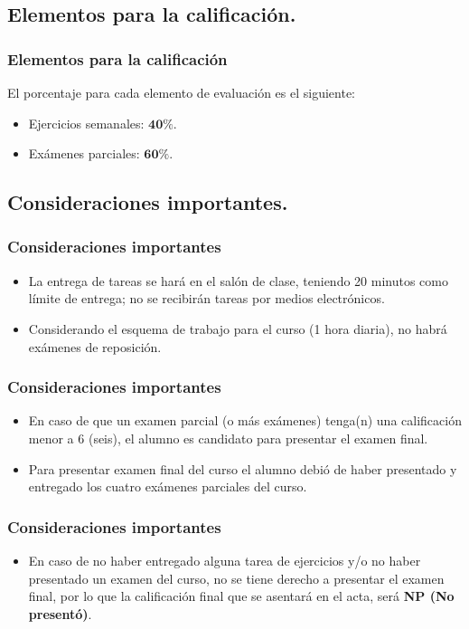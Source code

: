 \subsection{Elementos para la calificación.}
\begin{frame}
\frametitle{Elementos para la calificación}
El porcentaje para cada elemento de evaluación es el siguiente:
\begin{itemize}
\setlength{\itemsep}{0mm}
\item Ejercicios semanales: $\mathbf{40\%}$.
\item Exámenes parciales: $\mathbf{60\%}$.
\end{itemize}
\end{frame}
\subsection{Consideraciones importantes.}
\begin{frame}
\frametitle{Consideraciones importantes}
\begin{itemize}
\setlength{\itemsep}{0mm}
\item La entrega de tareas se hará en el salón de clase, teniendo 20 minutos como límite de entrega; no se recibirán tareas por medios electrónicos.
\item Considerando el esquema de trabajo para el curso (1 hora diaria), no habrá exámenes de reposición.
\end{itemize}
\end{frame}
\begin{frame}
\frametitle{Consideraciones importantes}
\begin{itemize}
\setlength{\itemsep}{0mm}
\item En caso de que un examen parcial (o más exámenes) tenga(n) una calificación menor a $6$ (seis), el alumno es candidato para presentar el examen final.
\item Para presentar examen final del curso el alumno debió de haber presentado y entregado los cuatro exámenes parciales del curso.
\end{itemize}
\end{frame}
\begin{frame}
\frametitle{Consideraciones importantes}
\begin{itemize}
\setlength{\itemsep}{0mm}
\item En caso de no haber entregado alguna tarea de ejercicios y/o no haber presentado un examen del curso, no se tiene derecho a presentar el examen final, por lo que la calificación final que se asentará en el acta, será \textbf{NP (No presentó)}.
\end{itemize}
\end{frame}

